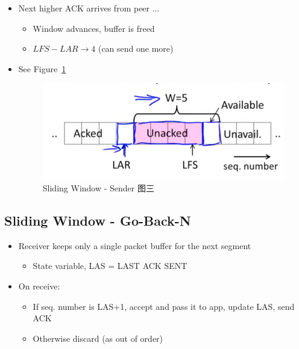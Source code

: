 \documentclass[12pt]{ctexart}   %
\begin{document}
\begin{itemize}
		 \item Next higher ACK arrives from peer ...
		 \begin{itemize}
		 	\item Window advances, buffer is freed
		 	\item $LFS - LAR \rightarrow 4$ (can send one more)
		 \end{itemize}
		  \item See Figure~\ref{fig:6-5-6}
		  
		 \begin{figure}[h!] %
		\centering
		 \includegraphics[scale=0.7]{images/6-5-6}
		\caption{  Sliding Window - Sender 图三}
		 \label{fig:6-5-6}
		 \end{figure}
		 
	\end{itemize}
	
	\subsection{Sliding Window - Go-Back-N}
	\begin{itemize}
		\item Receiver keeps only a single packet buffer for the next segment
		\begin{itemize}
			\item State variable, LAS = LAST ACK SENT
		\end{itemize}
		
		\item On receive:
		\begin{itemize}
			\item If seq. number is LAS+1, accept and pass it to app, update LAS, send ACK
			\item Otherwise discard (as out of order)
		\end{itemize}
	\end{itemize}
	
\end{document}
